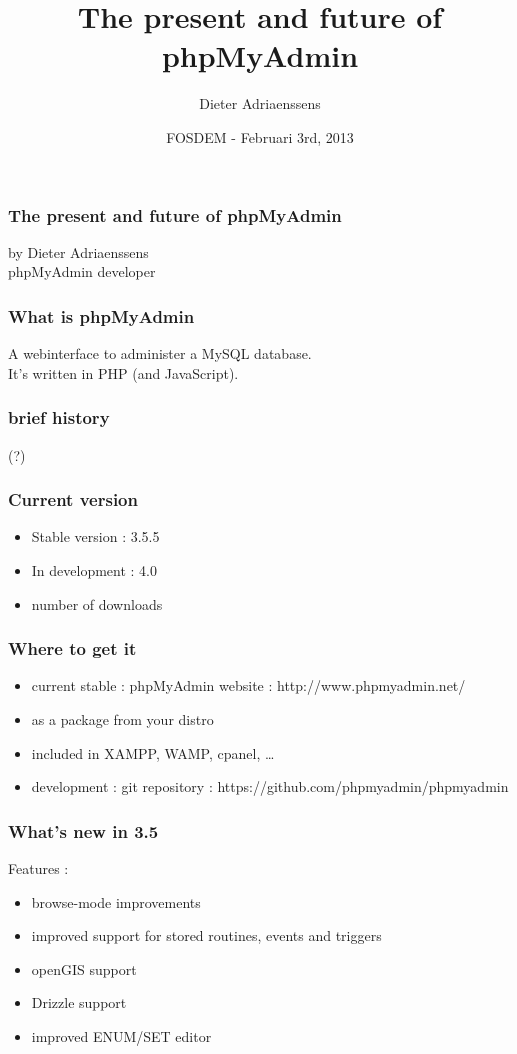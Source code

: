 \documentclass{beamer}
\title{The present and future of phpMyAdmin}
\author{Dieter Adriaenssens}
\institute{phpMyAdmin}
\date{FOSDEM - Februari 3rd, 2013}
\begin{document}
  \begin{frame}
  \frametitle{The present and future of phpMyAdmin}
    by Dieter Adriaenssens\\
    phpMyAdmin developer
  \end{frame}
  \begin{frame}
    \frametitle{What is phpMyAdmin}
      A webinterface to administer a MySQL database.\\
      It's written in PHP (and JavaScript).
  \end{frame}
  \begin{frame}
    \frametitle{brief history}
    (?)
  \end{frame}
  \begin{frame}
    \frametitle{Current version}
    \begin{itemize}[<+->]
      \item Stable version : 3.5.5
      \item In development : 4.0
      \item number of downloads
    \end{itemize}
  \end{frame}
  \begin{frame}
    \frametitle{Where to get it}
    \begin{itemize}[<+->]
      \item current stable : phpMyAdmin website : http://www.phpmyadmin.net/
      \item as a package from your distro
      \item included in XAMPP, WAMP, cpanel, \ldots
      \item development : git repository : https://github.com/phpmyadmin/phpmyadmin
    \end{itemize}
  \end{frame}
  \begin{frame}
    \frametitle{What's new in 3.5}
    Features :
    \pause
    \begin{itemize}[<+->]
      \item browse-mode improvements
      \item improved support for stored routines, events and triggers
      \item openGIS support
      \item Drizzle support
      \item improved ENUM/SET editor
    \end{itemize}
  \end{frame}
\end{document}

